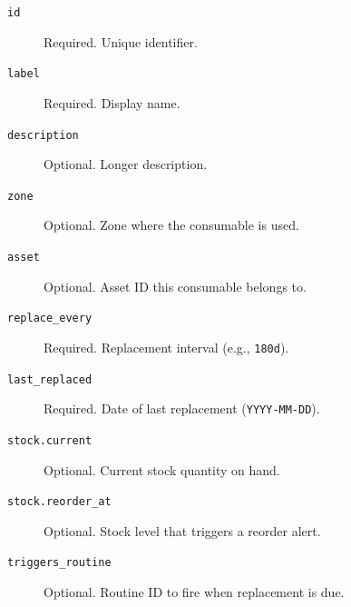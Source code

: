 \begin{description}
  \item[\texttt{id}] Required. Unique identifier.
  \item[\texttt{label}] Required. Display name.
  \item[\texttt{description}] Optional. Longer description.
  \item[\texttt{zone}] Optional. Zone where the consumable is used.
  \item[\texttt{asset}] Optional. Asset ID this consumable belongs to.
  \item[\texttt{replace\_every}] Required. Replacement interval (e.g., \texttt{180d}).
  \item[\texttt{last\_replaced}] Required. Date of last replacement (\texttt{YYYY-MM-DD}).
  \item[\texttt{stock.current}] Optional. Current stock quantity on hand.
  \item[\texttt{stock.reorder\_at}] Optional. Stock level that triggers a reorder alert.
  \item[\texttt{triggers\_routine}] Optional. Routine ID to fire when replacement is due.
\end{description}
